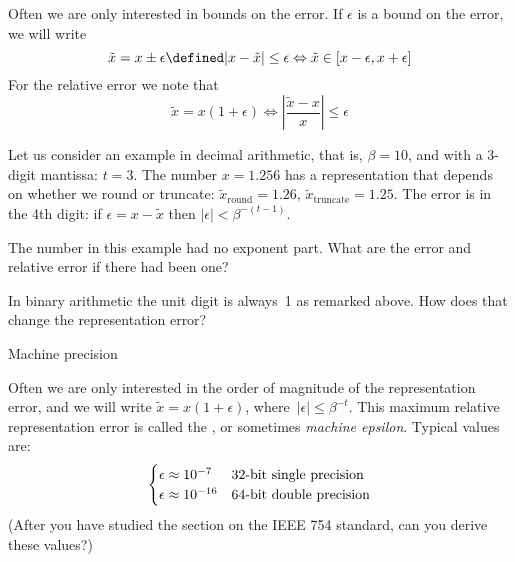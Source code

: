 Often we are only interested in bounds on the error. If $\epsilon$ is
a bound on the error, we will write
\begin{equation}
  \tilde x = x\pm\epsilon \defined
    |x-\tilde x|\leq\epsilon 
    \Leftrightarrow \tilde x\in[x-\epsilon,x+\epsilon]
\end{equation}
For the relative error we note that
\begin{equation}
  \tilde x =x(1+\epsilon) \Leftrightarrow
    \left|\frac{\tilde x-x}{x}\right|\leq \epsilon
\end{equation}

Let us consider an example in decimal arithmetic, that is, $\beta=10$,
and with a 3-digit mantissa: $t=3$.  The number $x=1.256$ has a
representation that depends on whether we round or truncate: $\tilde
x_{\mathrm{round}}=1.26$, $\tilde x_{\mathrm{truncate}}=1.25$.
The error is in the 4th digit: if $\epsilon=x-\tilde x$ 
then $|\epsilon|<\beta^{-(t-1)}$.

\begin{exercise}
The number in this example had no exponent part. What are the error
and relative error if there had been one?
\end{exercise}
\begin{exercise}
  In binary arithmetic the unit digit is always~1 as remarked above.
  How does that change the representation error?
\end{exercise}

 {Machine precision}
\label{sec:machine-eps}

Often we are only interested in the order of magnitude of the
representation error,
and we will write $\tilde x=x(1+\epsilon)$, where~$|\epsilon|\leq\beta^{-t}$.
This maximum relative representation error is called the
,
or sometimes
\emph{machine epsilon}.
Typical values are:
\begin{equation} 
\begin{cases}
  \epsilon\approx10^{-7}&\hbox{32-bit single precision}\\
  \epsilon\approx10^{-16}&\hbox{64-bit double precision}
\end{cases}
\end{equation}
(After you have studied the section on the IEEE 754 standard,
can you derive these values?)

